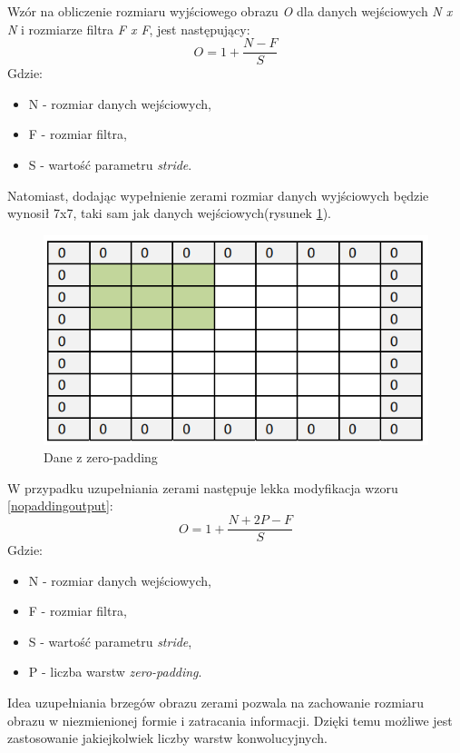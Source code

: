 \documentclass[a4paper,12pt,oneside]{book} %
\begin{document}
Wzór na obliczenie rozmiaru wyjściowego obrazu \emph{O} dla danych wejściowych \emph{N x N} i rozmiarze filtra \emph{F x F}, jest następujący:
\begin{equation}
	O = 1 + \frac{N-F}{S}
	\label{nopaddingoutput}
\end{equation}
Gdzie:
\begin{itemize}
	\item N - rozmiar danych wejściowych,
	\item F - rozmiar filtra,
	\item S - wartość parametru \emph{stride}.
\end{itemize}


Natomiast, dodając wypełnienie zerami rozmiar danych wyjściowych będzie wynosił 7x7, taki sam jak danych wejściowych(rysunek \ref{padding})\cite{8308186}. 

\begin{figure}[h]
	\centering
	\includegraphics[scale=0.45]{padding.png}
	\caption{Dane z zero-padding\cite{8308186}}
	\label{padding}
\end{figure}

W przypadku uzupełniania zerami następuje lekka modyfikacja wzoru \ref{nopaddingoutput}:
\begin{equation}
	O = 1 + \frac{N+2P-F}{S}
	\label{paddingoutput}
\end{equation}
Gdzie:
\begin{itemize}
	\item N - rozmiar danych wejściowych,
	\item F - rozmiar filtra,
	\item S - wartość parametru \emph{stride},
	\item P - liczba warstw \emph{zero-padding}.
\end{itemize}

Idea uzupełniania brzegów obrazu zerami pozwala na zachowanie rozmiaru obrazu w niezmienionej formie i zatracania informacji. Dzięki temu możliwe jest zastosowanie jakiejkolwiek liczby warstw konwolucyjnych\cite{8308186}.
\end{document}
